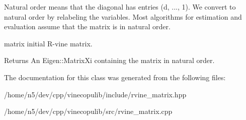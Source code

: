 Natural order means that the diagonal has entries (d, ..., 1). We convert to natural order by relabeling the variables. Most algorithms for estimation and evaluation assume that the matrix is in natural order.

matrix initial R-\/vine matrix.

\begin{DoxyReturn}{Returns}
An Eigen\+::\+Matrix\+Xi containing the matrix in natural order. 
\end{DoxyReturn}


The documentation for this class was generated from the following files\+:\begin{DoxyCompactItemize}
\item 
/home/n5/dev/cpp/vinecopulib/include/rvine\+\_\+matrix.\+hpp\item 
/home/n5/dev/cpp/vinecopulib/src/rvine\+\_\+matrix.\+cpp\end{DoxyCompactItemize}
